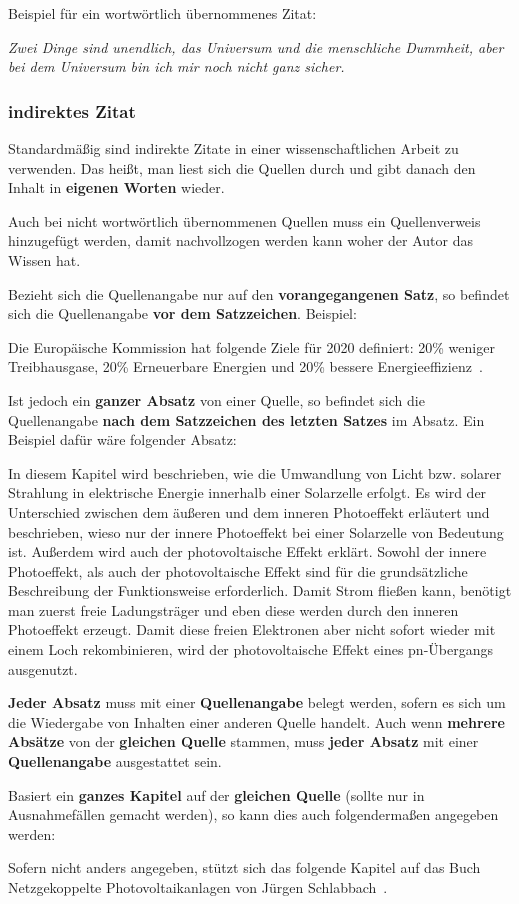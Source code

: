 Beispiel für ein wortwörtlich übernommenes Zitat:

\begin{center}
		{\glqq}\textit{Zwei Dinge sind unendlich, das Universum und die menschliche Dummheit, aber bei dem Universum bin ich mir noch nicht ganz sicher.}{\grqq} \cite{Einstein1941}
\end{center}


\subsubsection{indirektes Zitat}

Standardmäßig sind indirekte Zitate in einer wissenschaftlichen Arbeit zu verwenden. Das heißt, man liest sich die Quellen durch und gibt danach den Inhalt in \textbf{eigenen Worten} wieder.

Auch bei nicht wortwörtlich übernommenen Quellen muss ein Quellenverweis hinzugefügt werden, damit nachvollzogen werden kann woher der Autor das Wissen hat. 

Bezieht sich die Quellenangabe nur auf den \textbf{vorangegangenen Satz}, so befindet sich die Quellenangabe \textbf{vor dem Satzzeichen}. Beispiel:

Die Europäische Kommission hat folgende Ziele für 2020 definiert: 20\% weniger Treibhausgase, 20\% Erneuerbare Energien und 20\% bessere Energieeffizienz~\cite{EC2008}.

Ist jedoch ein \textbf{ganzer Absatz} von einer Quelle, so befindet sich die Quellenangabe \textbf{nach dem Satzzeichen des letzten Satzes} im Absatz. Ein Beispiel dafür wäre folgender Absatz:

In diesem Kapitel wird beschrieben, wie die Umwandlung von Licht bzw. solarer Strahlung in elektrische Energie innerhalb einer Solarzelle erfolgt. Es wird der Unterschied zwischen dem äußeren und dem inneren Photoeffekt erläutert und beschrieben, wieso nur der innere Photoeffekt bei einer Solarzelle von Bedeutung ist. Außerdem wird auch der photovoltaische Effekt erklärt. Sowohl der innere Photoeffekt, als auch der photovoltaische Effekt sind für die grundsätzliche Beschreibung der Funktionsweise erforderlich. Damit Strom fließen kann, benötigt man zuerst freie Ladungsträger und eben diese werden durch den inneren Photoeffekt erzeugt. Damit diese freien Elektronen aber nicht sofort wieder mit einem Loch rekombinieren, wird der photovoltaische Effekt eines pn-Übergangs ausgenutzt.~\cite{Finke2012}

\textbf{Jeder Absatz} muss mit einer \textbf{Quellenangabe} belegt werden, sofern es sich um die Wiedergabe von Inhalten einer anderen Quelle handelt. Auch wenn\textbf{ mehrere Absätze} von der \textbf{gleichen Quelle} stammen, muss \textbf{jeder Absatz} mit einer \textbf{Quellenangabe} ausgestattet sein.\

Basiert ein \textbf{ganzes Kapitel} auf der \textbf{gleichen Quelle} (sollte nur in Ausnahmefällen gemacht werden), so kann dies auch folgendermaßen angegeben werden:

Sofern nicht anders angegeben, stützt sich das folgende Kapitel auf das Buch {\glqq}Netzgekoppelte Photovoltaikanlagen{\grqq} von Jürgen Schlabbach~\cite{Schlabbach2011}.